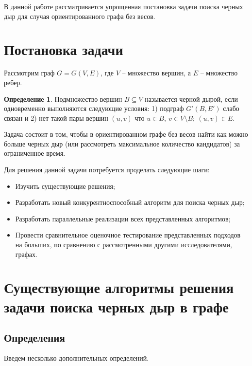 \documentclass[12pt,a4paper,oneside,openany]{article}
\theoremstyle{definition}
\newtheorem{definition}{Определение}[]
\theoremstyle{lemma}
\theoremstyle{remark}
\begin{document}
В данной работе рассматривается упрощенная постановка задачи поиска черных дыр для случая ориентированного графа без весов.

\cleardoublepage
\section{Постановка задачи}\label{sec:taskstatement}

Рассмотрим граф $G = G(V,E)$, где $V$ -- множество вершин, а $E$ -- множество ребер.

\begin{definition}\label{def:blackhole}
Подмножество вершин $B \subseteq V$ называется черной дырой, если одновременно выполняются следующие условия:
1) подграф $G'(B,E')$ слабо связан и 2) нет такой пары вершин $(u,v)$ что $u \in B,\ v \in V\setminus{B};\ (u,v) \in E$.
\end{definition}

Задача состоит в том, чтобы в ориентированном графе без весов найти как можно больше черных дыр (или рассмотреть максимальное количество кандидатов) за ограниченное время.

Для решения данной задачи потребуется проделать следующие шаги:
\begin{itemize}
    \item Изучить существующие решения;
    \item Разработать новый конкурентноспособный алгоритм для поиска черных дыр;
    \item Разработать параллельные реализации всех представленных алгоритмов;
    \item Провести сравнительное оценочное тестирование представленных подходов на больших, по сравнению с рассмотренными другими исследователями, графах.
\end{itemize}

\cleardoublepage

\section{Существующие алгоритмы решения задачи поиска черных дыр в графе}\label{sec:prevsolutions}

\subsection{Определения}\label{sec:definitions}

Введем несколько дополнительных определений.
\end{document}
